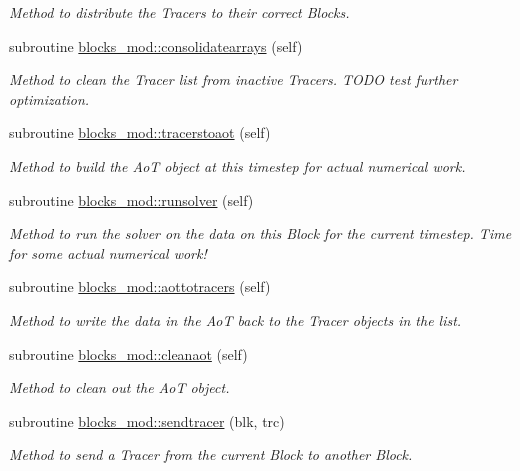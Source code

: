 \begin{DoxyCompactItemize}
\begin{DoxyCompactList}\small\item\em Method to distribute the Tracers to their correct Blocks. \end{DoxyCompactList}\item 
subroutine \mbox{\hyperlink{namespaceblocks__mod_a25ff530b5125e4cee5b1f474b2491883}{blocks\+\_\+mod\+::consolidatearrays}} (self)
\begin{DoxyCompactList}\small\item\em Method to clean the Tracer list from inactive Tracers. T\+O\+DO test further optimization. \end{DoxyCompactList}\item 
subroutine \mbox{\hyperlink{namespaceblocks__mod_ae7afa742f8f89a6a8afdefb7f8c87efd}{blocks\+\_\+mod\+::tracerstoaot}} (self)
\begin{DoxyCompactList}\small\item\em Method to build the AoT object at this timestep for actual numerical work. \end{DoxyCompactList}\item 
subroutine \mbox{\hyperlink{namespaceblocks__mod_a3245bdadbec6bb123c517921d1503b48}{blocks\+\_\+mod\+::runsolver}} (self)
\begin{DoxyCompactList}\small\item\em Method to run the solver on the data on this Block for the current timestep. Time for some actual numerical work! \end{DoxyCompactList}\item 
subroutine \mbox{\hyperlink{namespaceblocks__mod_a27c7e788c5f3979bfe9d43aad138286a}{blocks\+\_\+mod\+::aottotracers}} (self)
\begin{DoxyCompactList}\small\item\em Method to write the data in the AoT back to the Tracer objects in the list. \end{DoxyCompactList}\item 
subroutine \mbox{\hyperlink{namespaceblocks__mod_a6cc313e046daa2720cbca810d083faa0}{blocks\+\_\+mod\+::cleanaot}} (self)
\begin{DoxyCompactList}\small\item\em Method to clean out the AoT object. \end{DoxyCompactList}\item 
subroutine \mbox{\hyperlink{namespaceblocks__mod_a5a9992de40470e417ec8e40e688f6a0e}{blocks\+\_\+mod\+::sendtracer}} (blk, trc)
\begin{DoxyCompactList}\small\item\em Method to send a Tracer from the current Block to another Block. \end{DoxyCompactList}\item 

\end{DoxyCompactItemize}
